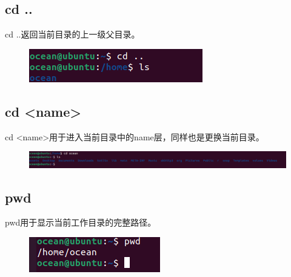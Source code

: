 \documentclass{article}
\begin{document}
\subsection{cd ..}
cd ..返回当前目录的上一级父目录。
\begin{figure}[H]
    \centering
    \includegraphics[width=1\linewidth]{cd1.png}
\end{figure}

\subsection{cd <name>}
cd <name>用于进入当前目录中的name层，同样也是更换当前目录。
\begin{figure}[H]
    \centering
    \includegraphics[width=1\linewidth]{cd2.png}
\end{figure}

\subsection{pwd}
pwd用于显示当前工作目录的完整路径。
\begin{figure}[H]
    \centering
    \includegraphics[width=1\linewidth]{pwd.png}
\end{figure}
\end{document}
